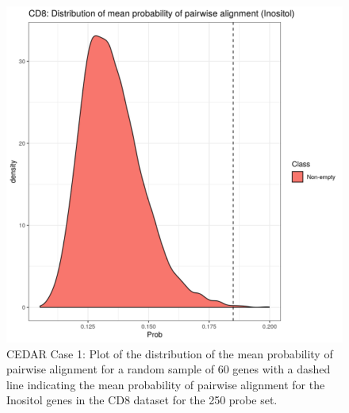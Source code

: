 \documentclass[14pt]{extarticle} %
\begin{document}
	\begin{figure}[h]
		\centering
		\includegraphics[scale=0.75]{Images/Biology_data/Set_250/All_datasets/Mean_alignment_probability/CD8_KEGG_INOSITOL_PHOSPHATE_METABOLISM.png}
		\caption{CEDAR Case 1: Plot of the distribution of the mean probability of pairwise alignment for a random sample of 60 genes with a dashed line indicating the mean probability of pairwise alignment for the Inositol genes in the CD8 dataset for the 250 probe set.}
		\label{fig:results:cedar_1:mdi_cd8_inostiol_alignemnt_prob_distn}
	\end{figure}
\end{document}
